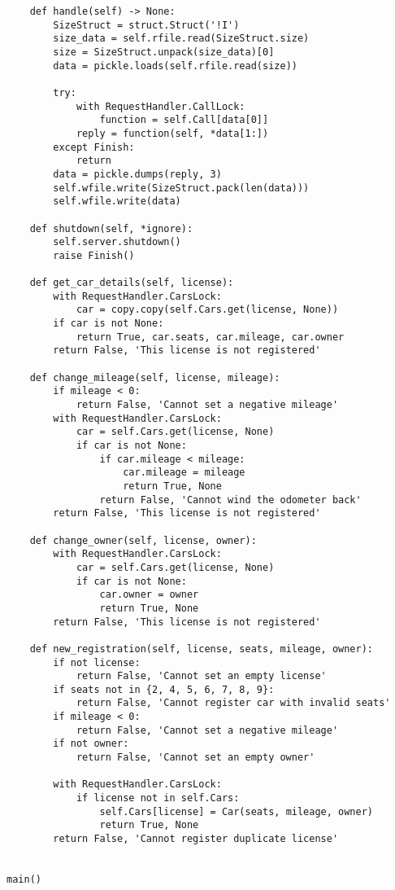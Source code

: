 \begin{lstlisting}
    def handle(self) -> None:
        SizeStruct = struct.Struct('!I')
        size_data = self.rfile.read(SizeStruct.size)
        size = SizeStruct.unpack(size_data)[0]
        data = pickle.loads(self.rfile.read(size))

        try:
            with RequestHandler.CallLock:
                function = self.Call[data[0]]
            reply = function(self, *data[1:])
        except Finish:
            return
        data = pickle.dumps(reply, 3)
        self.wfile.write(SizeStruct.pack(len(data)))
        self.wfile.write(data)

    def shutdown(self, *ignore):
        self.server.shutdown()
        raise Finish()

    def get_car_details(self, license):
        with RequestHandler.CarsLock:
            car = copy.copy(self.Cars.get(license, None))
        if car is not None:
            return True, car.seats, car.mileage, car.owner
        return False, 'This license is not registered'

    def change_mileage(self, license, mileage):
        if mileage < 0:
            return False, 'Cannot set a negative mileage'
        with RequestHandler.CarsLock:
            car = self.Cars.get(license, None)
            if car is not None:
                if car.mileage < mileage:
                    car.mileage = mileage
                    return True, None
                return False, 'Cannot wind the odometer back'
        return False, 'This license is not registered'

    def change_owner(self, license, owner):
        with RequestHandler.CarsLock:
            car = self.Cars.get(license, None)
            if car is not None:
                car.owner = owner
                return True, None
        return False, 'This license is not registered'

    def new_registration(self, license, seats, mileage, owner):
        if not license:
            return False, 'Cannot set an empty license'
        if seats not in {2, 4, 5, 6, 7, 8, 9}:
            return False, 'Cannot register car with invalid seats'
        if mileage < 0:
            return False, 'Cannot set a negative mileage'
        if not owner:
            return False, 'Cannot set an empty owner'

        with RequestHandler.CarsLock:
            if license not in self.Cars:
                self.Cars[license] = Car(seats, mileage, owner)
                return True, None
        return False, 'Cannot register duplicate license'


main()
\end{lstlisting}


